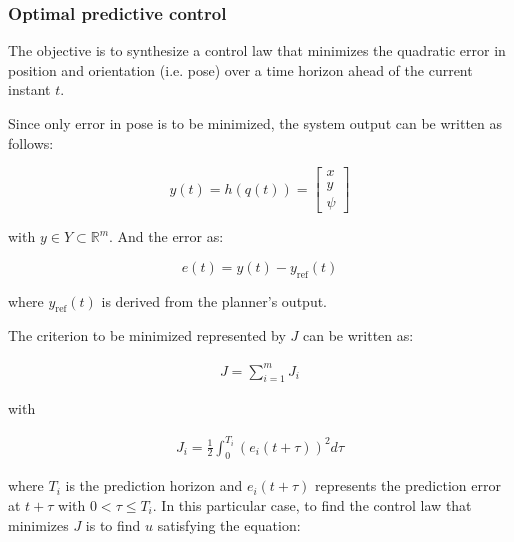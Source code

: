 \documentclass[letterpaper, 10 pt, conference]{ieeeconf}  %
\begin{document}
%




\subsubsection{Optimal predictive control}

\mbox{}

The objective is to synthesize a control law that minimizes the quadratic error in position and orientation (i.e. pose) over a time horizon ahead of the current instant $t$.

Since only error in pose is to be minimized, the system output can be written as follows:

\[
y(t) = h(q(t)) = \left[\begin{array}{c}
x\\
y\\
\psi
\end{array}
\right]
\label{eq:observer}
\]

with ${y \in Y \subset \mathds{R}^m}$. And the error as:

\[
	e(t) =  y(t) - y_{\text{ref}}(t)
\]

where ${y_{\text{ref}}(t)}$ is derived from the planner's output.

The criterion to be minimized represented by $J$ can be written as:

\begin{align*}
J = \sum_{i=1}^m J_i 
\end{align*}

with

\begin{align*}
J_i = \frac{1}{2}\int_0^{T_i} (e_i(t+\tau))^2d\tau
\end{align*}

where $T_i$ is the prediction horizon and ${e_i(t+\tau)}$ represents the prediction error at ${t+\tau}$ with ${0 < \tau \leq T_i}$.
In this particular case, to find the control law that minimizes $J$ is to find $u$ satisfying the equation:
\end{document}
